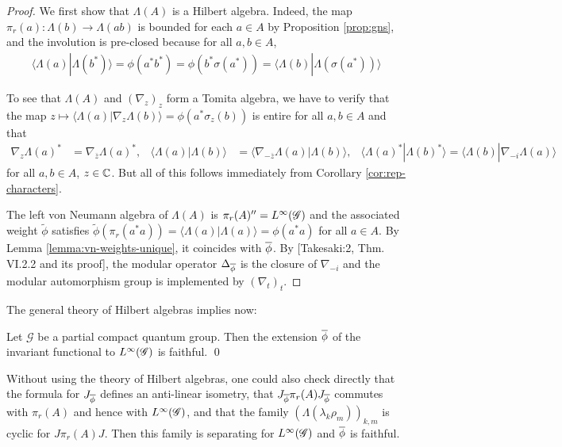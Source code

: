 \begin{proof}
  We first show that $\Lambda(A)$ is a Hilbert algebra. Indeed, the
  map $\pi_{r}(a)\colon \Lambda(b) \to \Lambda(ab)$ is bounded for
  each $a \in A$ by Proposition \ref{prop:gns}, and the involution is
  pre-closed because  for all $a,b \in A$,
  \begin{align*}
    \langle \Lambda(a)|\Lambda(b^{*})\rangle = \phi(a^{*}b^{*}) =
    \phi(b^{*}\sigma(a^{*})) = \langle
    \Lambda(b)|\Lambda(\sigma(a^{*}))\rangle
  \end{align*}

To see that $\Lambda(A)$ and $(\nabla_{z})_{z}$ form a Tomita
  algebra, we have to verify that the map
  $z\mapsto
  \langle \Lambda(a)|\nabla_{z}\Lambda(b)\rangle =
  \phi(a^{*}\sigma_{z}(b))$ is entire for all $a,b\in A$ and that
  \begin{align*}
    \nabla_{z}\Lambda(a)^{*} &= \nabla_{\overline{z}}\Lambda(a)^{*}, &
    \langle \Lambda(a)|\Lambda(b)\rangle &= \langle
    \nabla_{-\overline{z}}\Lambda(a) |\Lambda(b)\rangle, & \langle
    \Lambda(a)^{*}|\Lambda(b)^{*}\rangle = \langle \Lambda(b)|\nabla_{-i}\Lambda(a)\rangle
  \end{align*}
  for all $a,b\in A$, $z\in \mathbb{C}$. But all of this follows immediately
  from Corollary \ref{cor:rep-characters}.


  The left von Neumann algebra of $\Lambda(A)$ is
  $\pi_{r}(A)''=L^{\infty}(\mathscr{G})$ and the associated weight $\tilde\phi$
  satisfies $\tilde
  \phi(\pi_{r}(a^{*}a))=\langle\Lambda(a)|\Lambda(a)\rangle =
  \phi(a^{*}a)$ for all $a\in A$. By Lemma
  \ref{lemma:vn-weights-unique}, it coincides with $\overline{\phi}$.  By
  \cite{} [Takesaki:2, Thm. VI.2.2 and its proof], the modular
  operator $\Delta_{\overline{\phi}}$ is the closure of $\nabla_{-i}$ and the
  modular automorphism group is implemented by $(\nabla_{t})_{t}$. 
\end{proof}
 The general theory of Hilbert algebras \cite{} implies now:
\begin{Prop} \label{prop:hilbert-algebra} Let $\mathscr{G}$ be a
  partial compact quantum group. Then the extension $\overline{\phi}$ of the
  invariant functional to $L^{\infty}(\mathscr{G})$ is faithful. \qed
\end{Prop}
\begin{Rem}
  Without using the theory of Hilbert algebras, one could also check
  directly that the formula for $J_{\overline{\phi}}$ defines an anti-linear
  isometry, that $J_{\overline{\phi}}\pi_{r}(A)J_{\overline{\phi}}$ commutes with $\pi_{r}(A)$ and hence
  with $L^{\infty}(\mathscr{G})$, and that the family
  $(\Lambda(\lambda_{k}\rho_{m}))_{k,m}$ is cyclic for
  $J\pi_{r}(A)J$. Then this family is separating for $L^{\infty}(\mathscr{G})$ and
  $\overline{\phi}$ is faithful.
\end{Rem}

